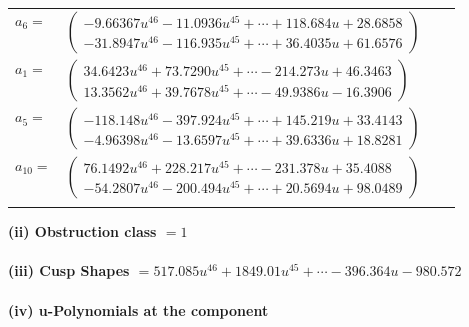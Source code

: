 \documentclass[1p]{elsarticle_modified}
\theoremstyle{definition}
\begin{document}
\begin{tabular}{m{7pt} m{180pt} m{7pt} m{180pt} }
\flushright $a_{6}=$&$\begin{pmatrix}-9.66367 u^{46}-11.0936 u^{45}+\cdots+118.684 u+28.6858\\-31.8947 u^{46}-116.935 u^{45}+\cdots+36.4035 u+61.6576\end{pmatrix}$ \\
\flushright $a_{1}=$&$\begin{pmatrix}34.6423 u^{46}+73.7290 u^{45}+\cdots-214.273 u+46.3463\\13.3562 u^{46}+39.7678 u^{45}+\cdots-49.9386 u-16.3906\end{pmatrix}$ \\
\flushright $a_{5}=$&$\begin{pmatrix}-118.148 u^{46}-397.924 u^{45}+\cdots+145.219 u+33.4143\\-4.96398 u^{46}-13.6597 u^{45}+\cdots+39.6336 u+18.8281\end{pmatrix}$ \\
\flushright $a_{10}=$&$\begin{pmatrix}76.1492 u^{46}+228.217 u^{45}+\cdots-231.378 u+35.4088\\-54.2807 u^{46}-200.494 u^{45}+\cdots+20.5694 u+98.0489\end{pmatrix}$\\&\end{tabular}
\flushleft \textbf{(ii) Obstruction class $= 1$}\\~\\
\flushleft \textbf{(iii) Cusp Shapes $= 517.085 u^{46}+1849.01 u^{45}+\cdots-396.364 u-980.572$}\\~\\
\newpage\renewcommand{\arraystretch}{1}
\flushleft \textbf{(iv) u-Polynomials at the component}\newline \\
\end{document}
